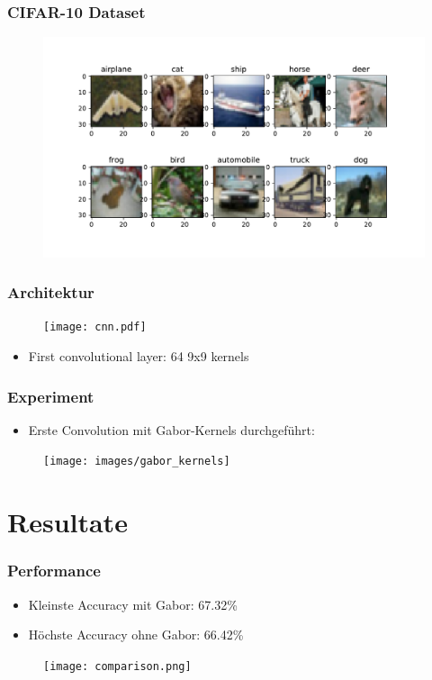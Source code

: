 \documentclass{beamer}
\begin{document}
\begin{frame}
\frametitle{CIFAR-10 Dataset}
	\begin{figure}
		\centering
		\includegraphics[width=\linewidth]{images/cifar10}
		\label{fig:cifar10}
	\end{figure}
	
\end{frame}


\begin{frame}
\frametitle{Architektur}
\begin{figure}
	\centering
	\texttt{[image: cnn.pdf]}
	\label{fig:cnn}
\end{figure}
\begin{itemize}
	\item[] First convolutional layer: 64 9x9 kernels
\end{itemize}

\end{frame}


\begin{frame}
\frametitle{Experiment}
	\begin{itemize}
		 \item [] Erste Convolution mit Gabor-Kernels durchgeführt:
	\end{itemize}
	\begin{figure}
		\centering
		\texttt{[image: images/gabor\_kernels]}
		\label{fig:gaborkernels}
	\end{figure}
	
\end{frame}


\section{Resultate}

\begin{frame}
\frametitle{Performance}
\begin{itemize}
	\item[] Kleinste Accuracy mit Gabor: 67.32\%
	\item[] Höchste Accuracy ohne Gabor: 66.42\%
\end{itemize}
\begin{figure}
	\centering
	\texttt{[image: comparison.png]}
	\label{fig:comparison}
\end{figure}

\end{frame}
\end{document}
